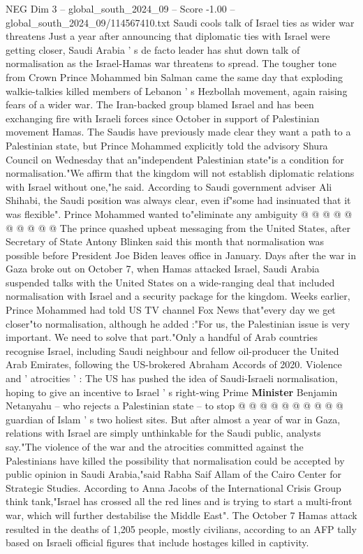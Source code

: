 \begin{textsample}{NEG Dim 3 – global\_south\_2024\_09 – Score -1.00 – global\_south\_2024\_09/114567410.txt}  \label{ex:f3_neg_123}
Saudi cools talk of Israel ties as wider war threatens Just a year after announcing that diplomatic ties with Israel were getting closer, Saudi Arabia ' s de facto leader has shut down talk of normalisation as the Israel-Hamas war threatens to spread.
The tougher tone from Crown Prince Mohammed bin Salman came the same day that exploding walkie-talkies killed members of Lebanon ' s Hezbollah movement, again raising fears of a wider war.
The Iran-backed group blamed Israel and has been exchanging fire with Israeli forces since October in support of Palestinian movement Hamas.
The Saudis have previously made clear they want a path to a Palestinian state, but Prince Mohammed explicitly told the advisory Shura Council on Wednesday that an"independent Palestinian state"is a condition for normalisation."We affirm that the kingdom will not establish diplomatic relations with Israel without one,"he said.
According to Saudi government adviser Ali Shihabi, the Saudi position was always clear, even if"some had insinuated that it was flexible".
Prince Mohammed wanted to"eliminate any ambiguity @ @ @ @ @ @ @ @ @ @ The prince quashed upbeat messaging from the United States, after Secretary of State Antony Blinken said this month that normalisation was possible before President Joe Biden leaves office in January.
Days after the war in Gaza broke out on October 7, when Hamas attacked Israel, Saudi Arabia suspended talks with the United States on a wide-ranging deal that included normalisation with Israel and a security package for the kingdom.
Weeks earlier, Prince Mohammed had told US TV channel Fox News that"every day we get closer"to normalisation, although he added :"For us, the Palestinian issue is very important.
We need to solve that part."Only a handful of Arab countries recognise Israel, including Saudi neighbour and fellow oil-producer the United Arab Emirates, following the US-brokered Abraham Accords of 2020.
Violence and ' atrocities ' : The US has pushed the idea of Saudi-Israeli normalisation, hoping to give an incentive to Israel ' s right-wing Prime \textbf{Minister} Benjamin Netanyahu -- who rejects a Palestinian state -- to stop @ @ @ @ @ @ @ @ @ @ guardian of Islam ' s two holiest sites.
But after almost a year of war in Gaza, relations with Israel are simply unthinkable for the Saudi public, analysts say."The violence of the war and the atrocities committed against the Palestinians have killed the possibility that normalisation could be accepted by public opinion in Saudi Arabia,"said Rabha Saif Allam of the Cairo Center for Strategic Studies.
According to Anna Jacobs of the International Crisis Group think tank,"Israel has crossed all the red lines and is trying to start a multi-front war, which will further destabilise the Middle East".
The October 7 Hamas attack resulted in the deaths of 1,205 people, mostly civilians, according to an AFP tally based on Israeli official figures that include hostages killed in captivity.

\end{textsample}

